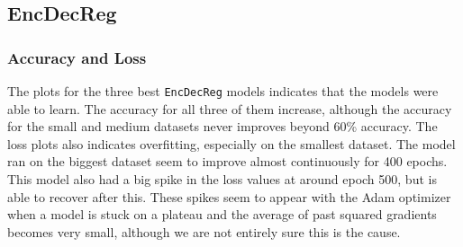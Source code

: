 \subsection{EncDecReg}
\subsubsection{Accuracy and Loss}

The plots for the three best {\tt EncDecReg} models indicates that the models were able to learn. The accuracy for all three of them increase, although the accuracy for the small and medium datasets never improves beyond 60\% accuracy. The loss plots also indicates overfitting, especially on the smallest dataset. The model ran on the biggest dataset seem to improve almost continuously for 400 epochs. This model also had a big spike in the loss values at around epoch 500, but is able to recover after this. These spikes seem to appear with the Adam optimizer when a model is stuck on a plateau and the average of past squared gradients becomes very small, although we are not entirely sure this is the cause.

\newpage
